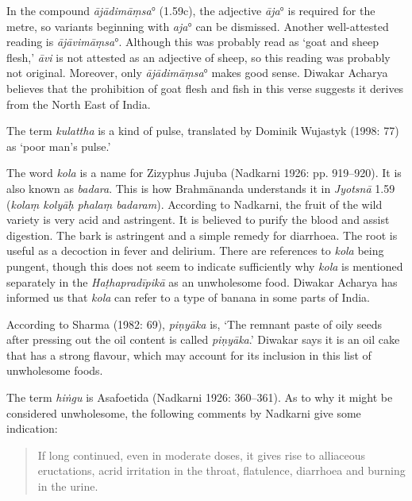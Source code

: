 \begin{ekdosis}
\begin{philcomm}[hp01_059]
In the compound \emph{ājādimāṃsa}° (1.59c), the adjective \emph{āja}° is required for the metre,  so variants beginning with \emph{aja}° can be dismissed. Another well-attested reading is \emph{ājāvimāṃsa}°. Although this was probably read as `goat and sheep flesh,' \emph{āvi} is not attested as an adjective of sheep,
so this reading was probably not original. Moreover, only \emph{ājādimāṃsa}° makes good sense. Diwakar Acharya believes that the prohibition of goat flesh and fish in this verse suggests it derives from the North East of India.

The term \emph{kulattha} is a kind of pulse, translated by Dominik Wujastyk (1998: 77) as `poor man's pulse.'

The word \emph{kola} is a name for Zizyphus Jujuba (Nadkarni 1926: pp. 919--920). It is also known as \emph{badara}. This is how Brahmānanda understands it in \emph{Jyotsnā} 1.59 (\emph{kolaṃ kolyāḥ phalaṃ badaram}). According to Nadkarni, the fruit of the wild variety is very acid and astringent. It is believed to purify the blood and assist digestion. The bark is astringent and a simple remedy for diarrhoea. The root is useful as a decoction in fever and delirium. There are references to \emph{kola} being pungent, though this does not seem to indicate sufficiently why \emph{kola} is mentioned separately in the \emph{Haṭhapradīpikā} as an unwholesome food. Diwakar Acharya has informed us that \emph{kola} can refer to a type of banana in some parts of India.

According to Sharma (1982: 69), \emph{piṇyāka} is, ‘The remnant paste of oily seeds after pressing out the oil content is called \emph{piṇyāka}.’ Diwakar says it is an oil cake that has a strong flavour, which may account for its inclusion in this list of unwholesome foods.

The term \emph{hiṅgu} is Asafoetida (Nadkarni 1926: 360–361). As to why it might be considered unwholesome, the following comments by Nadkarni give some indication:
\begin{quote}
If long continued, even in moderate doses, it gives rise to alliaceous eructations, acrid irritation in the throat, flatulence, diarrhoea and burning in the urine.
\end{quote}

\end{philcomm}


\end{ekdosis}
